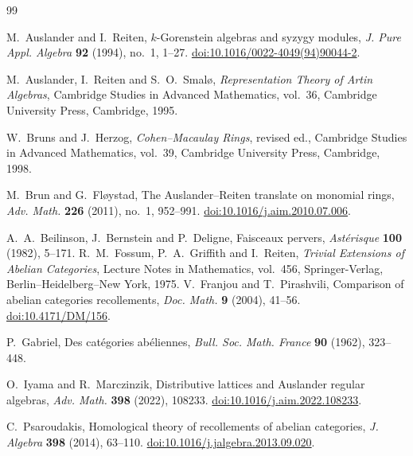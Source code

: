 \documentclass[12pt,reqno]{amsart}
\theoremstyle{definition}
\theoremstyle{remark}
\begin{document}
\begin{thebibliography}{99}

M.~Auslander and I.~Reiten,
\newblock $k$-Gorenstein algebras and syzygy modules,
\newblock \emph{J. Pure Appl. Algebra} \textbf{92} (1994), no.~1, 1--27.
\newblock \href{https://doi.org/10.1016/0022-4049(94)90044-2}{doi:10.1016/0022-4049(94)90044-2}.

M.~Auslander, I.~Reiten and S.~O.~Smal\o,
\newblock \emph{Representation Theory of Artin Algebras},
\newblock Cambridge Studies in Advanced Mathematics, vol.~36,
Cambridge University Press, Cambridge, 1995.

W.~Bruns and J.~Herzog,
\newblock \emph{Cohen--Macaulay Rings},
\newblock revised ed., Cambridge Studies in Advanced Mathematics, vol.~39,
Cambridge University Press, Cambridge, 1998.



M.~Brun and G.~Fl\o ystad,
\newblock The Auslander--Reiten translate on monomial rings,
\newblock \emph{Adv. Math.} \textbf{226} (2011), no.~1, 952--991.
\newblock \href{https://doi.org/10.1016/j.aim.2010.07.006}{doi:10.1016/j.aim.2010.07.006}.

A.~A.~Beilinson, J.~Bernstein and P.~Deligne,
\newblock Faisceaux pervers,
\newblock \emph{Ast\'erisque} \textbf{100} (1982), 5--171.
R.~M.~Fossum, P.~A.~Griffith and I.~Reiten,
\newblock \emph{Trivial Extensions of Abelian Categories},
\newblock Lecture Notes in Mathematics, vol.~456,
Springer-Verlag, Berlin--Heidelberg--New York, 1975.
V.~Franjou and T.~Pirashvili,
\newblock Comparison of abelian categories recollements,
\newblock \emph{Doc. Math.} \textbf{9} (2004), 41--56.
\newblock \href{https://doi.org/10.4171/DM/156}{doi:10.4171/DM/156}.

P.~Gabriel,
\newblock Des cat\'egories ab\'eliennes,
\newblock \emph{Bull. Soc. Math. France} \textbf{90} (1962), 323--448.

O.~Iyama and R.~Marczinzik,
\newblock Distributive lattices and Auslander regular algebras,
\newblock \emph{Adv. Math.} \textbf{398} (2022), 108233.
\newblock \href{https://doi.org/10.1016/j.aim.2022.108233}{doi:10.1016/j.aim.2022.108233}.


C.~Psaroudakis,
\newblock Homological theory of recollements of abelian categories,
\newblock \emph{J. Algebra} \textbf{398} (2014), 63--110.
\newblock \href{https://doi.org/10.1016/j.jalgebra.2013.09.020}{doi:10.1016/j.jalgebra.2013.09.020}.



\end{thebibliography}
\end{document}
